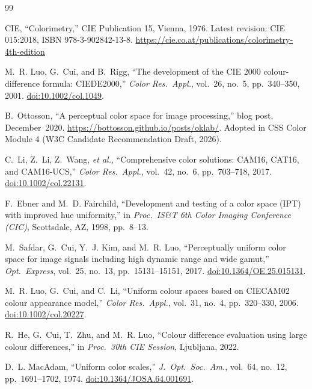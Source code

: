 \documentclass[11pt, twocolumn]{article}
\begin{document}

\begin{thebibliography}{99}

CIE, ``Colorimetry,'' CIE Publication 15, Vienna, 1976. Latest
revision: CIE 015:2018, ISBN 978-3-902842-13-8.
\url{https://cie.co.at/publications/colorimetry-4th-edition}

M.~R. Luo, G.~Cui, and B.~Rigg, ``The development of the CIE 2000
colour-difference formula: CIEDE2000,'' \textit{Color Res.\ Appl.},
vol.~26, no.~5, pp.~340--350, 2001.
\href{https://doi.org/10.1002/col.1049}{doi:10.1002/col.1049}.

B.~Ottosson, ``A perceptual color space for image processing,''
blog post, December~2020.
\url{https://bottosson.github.io/posts/oklab/}.
Adopted in CSS Color Module 4 (W3C Candidate Recommendation Draft, 2026).

C.~Li, Z.~Li, Z.~Wang, \textit{et al.}, ``Comprehensive color
solutions: CAM16, CAT16, and CAM16-UCS,'' \textit{Color Res.\
Appl.}, vol.~42, no.~6, pp.~703--718, 2017.
\href{https://doi.org/10.1002/col.22131}{doi:10.1002/col.22131}.

F.~Ebner and M.~D. Fairchild, ``Development and testing of a color
space (IPT) with improved hue uniformity,'' in \textit{Proc.\ IS\&T
6th Color Imaging Conference (CIC)}, Scottsdale, AZ, 1998,
pp.~8--13.

M.~Safdar, G.~Cui, Y.~J. Kim, and M.~R. Luo, ``Perceptually uniform
color space for image signals including high dynamic range and wide
gamut,'' \textit{Opt.\ Express}, vol.~25, no.~13, pp.~15131--15151,
2017.
\href{https://doi.org/10.1364/OE.25.015131}{doi:10.1364/OE.25.015131}.

M.~R. Luo, G.~Cui, and C.~Li, ``Uniform colour spaces based on
CIECAM02 colour appearance model,'' \textit{Color Res.\ Appl.},
vol.~31, no.~4, pp.~320--330, 2006.
\href{https://doi.org/10.1002/col.20227}{doi:10.1002/col.20227}.

R.~He, G.~Cui, T.~Zhu, and M.~R. Luo, ``Colour difference
evaluation using large colour differences,'' in \textit{Proc.\
30th CIE Session}, Ljubljana, 2022.

D.~L. MacAdam, ``Uniform color scales,'' \textit{J.\ Opt.\ Soc.\
Am.}, vol.~64, no.~12, pp.~1691--1702, 1974.
\href{https://doi.org/10.1364/JOSA.64.001691}{doi:10.1364/JOSA.64.001691}.


\end{thebibliography}
\end{document}
